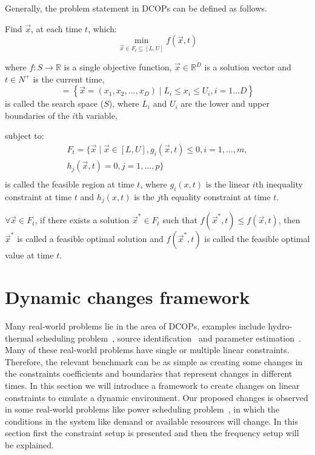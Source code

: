 \documentclass[conference]{IEEEtran}
\begin{document}
Generally, the problem statement in DCOPs can be defined as follows. 

Find $\vec{x}$, at each time $t$, which: 
\begin{equation}
		\min_{\vec{x}\in F_t\subseteq[L, U]} f(\vec{x}, t)
\end{equation}

where $f:S \rightarrow \mathbb{R}$ is a single objective function, $\vec{x} \in \mathbb{R}^D $ is a solution vector and $t \in N^+$ is the current time, 
\begin{equation}
[L, U]=  \left\lbrace \vec{x} = (x_{1},x_{2},...,x_{D}) \mid L_i \leq x_i \leq U_i, i = 1 \ldots D\right\rbrace
\end{equation}
is called the search space ($S$), where $L_i$ and $U_i$ are the lower and upper boundaries of the $i$th variable,

subject to:
\begin{equation}
\begin{array}{l}
\label{eq:searchspace}
F_{t}=\{ \vec{x} \mid \vec{x} \in [L,U], g_i (\vec{x},t) \le 0, i = 1, \ldots, m,\\
h_j (\vec{x},t) = 0,j = 1, \ldots, p\} \\
\end{array}
\end{equation}
is called the feasible region at time $t$, where $g_i(x, t)$ is the linear $i$th inequality constraint at time $t$ and $h_j(x,t)$ is the $j$th equality constraint at time $t$.

$\forall \vec{x} \in F_t$, if there exists a solution $\vec{x}^* \in F_t$ such that 
$f(\vec{x}^*,t)\leq f(\vec{x},t)$,  then $\vec{x}^*$ is called a feasible optimal solution 
and $f(\vec{x}^*,t)$ is called the feasible optimal value at time $t$. 


\section{Dynamic changes framework}
\label{sec:change-setup}
Many real-world problems lie in the area of DCOPs, examples include hydro-thermal scheduling problem~\cite{deb2007dynamic}, source identification~\cite{liu2008adaptive} and parameter estimation~\cite{prata2006simultaneous}. Many of these real-world problems have single or multiple linear constraints. Therefore, the relevant benchmark can be as simple as creating some changes in the constraints coefficients and boundaries that represent changes in different times. In this section we will introduce a framework to create changes on linear constraints to emulate a dynamic environment.
Our proposed changes is observed in some real-world problems like power scheduling problem~\cite{morales2014managing}, in which the conditions in the system like demand or available resources will change. In this section first the constraint setup is presented and then the frequency setup will be explained.
\end{document}
